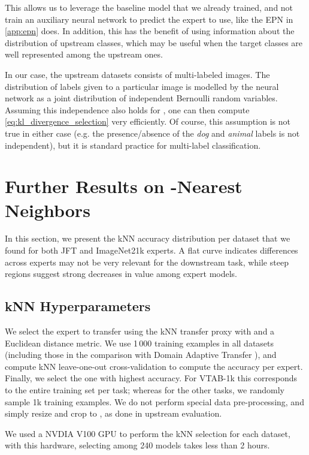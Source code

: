 \documentclass{article}
\newcommand{\JFT}{{JFT}\xspace}
\begin{document}
This allows us to leverage the baseline model that we already trained, and 
not train an auxiliary neural network to predict the expert to use, like the
EPN in \cref{app:epn} does. In addition, this has the benefit of using information about the distribution of upstream classes, which may be useful when the target classes
are well represented among the upstream ones.

In our case, the upstream datasets consists of multi-labeled images. 
The distribution of labels given to a particular image is modelled by the neural
network as a joint distribution of independent Bernoulli random variables.
Assuming this independence also holds for , one can then compute 
\cref{eq:kl_divergence_selection} very efficiently.
Of course, this assumption is not true in either case
(e.g. the presence/absence of the \emph{dog} and \emph{animal} labels is not 
independent), but it is standard practice for multi-label classification. \section{Further Results on \texorpdfstring{}{k}-Nearest Neighbors}
\label{app:knn}



In this section, we present the kNN accuracy distribution per dataset that we found for both \JFT and ImageNet21k experts.
A flat curve indicates differences across experts may not be very relevant for the downstream task, while steep regions suggest strong decreases in value among expert models.

\subsection{kNN Hyperparameters}
\label{subsec:knn_hyperparams}

We select the expert to transfer using the kNN transfer proxy with  and a Euclidean distance metric. We use 1\,000 training examples 
in all datasets (including those in the comparison with Domain 
Adaptive Transfer \cite{ngiam2018domain}), and compute kNN 
leave-one-out cross-validation to compute the accuracy per expert.
Finally, we select the one with highest accuracy.
For VTAB-1k this corresponds to the entire training set per task; 
whereas for the other tasks, we randomly sample 1k training examples.
We do not perform special data pre-processing, and simply resize and crop to , as done in upstream evaluation.

We used a NVDIA V100 GPU to perform the kNN selection for each dataset, with this hardware, 
selecting among 240 models takes less than 2 hours.
\end{document}
